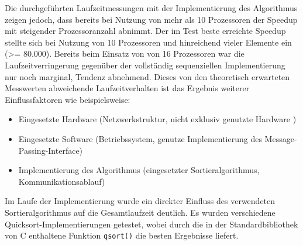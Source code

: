 \documentclass[a4paper,12pt]{scrartcl}
\begin{document}
Die durchgeführten Laufzeitmessungen mit der Implementierung des Algorithmus zeigen jedoch, dass bereits bei Nutzung von mehr als 10 Prozessoren der Speedup mit
steigender
Prozessoranzahl abnimmt. Der im Test beste erreichte Speedup stellte sich bei Nutzung von 10 Prozessoren und hinreichend vieler Elemente ein (>= 80.000).
Bereits beim Einsatz von von 16 Prozessoren war die Laufzeitverringerung gegenüber der vollständig sequenziellen Implementierung nur noch marginal, Tendenz
abnehmend. Dieses von den theoretisch erwarteten Messwerten abweichende Laufzeitverhalten ist das Ergebnis weiterer Einflussfaktoren wie beispielsweise:
\begin{itemize}
  \item Eingesetzte Hardware (Netzwerkstruktur, nicht exklusiv genutzte Hardware )
  \item Eingesetzte Software (Betriebssystem, genutze Implementierung des Message-Passing-Interface)
  \item Implementierung des Algorithmus (eingesetzter Sortieralgorithmus, Kommunikationsablauf)
\end{itemize}
Im Laufe der Implementierung wurde ein direkter Einfluss des verwendeten Sortieralgorithmus auf die Gesamtlaufzeit deutlich. Es wurden  verschiedene
Quicksort-Implementierungen getestet, wobei durch die in der Standardbibliothek von C enthaltene Funktion \texttt{qsort()} die besten Ergebnisse liefert.

\clearpage
\end{document}
